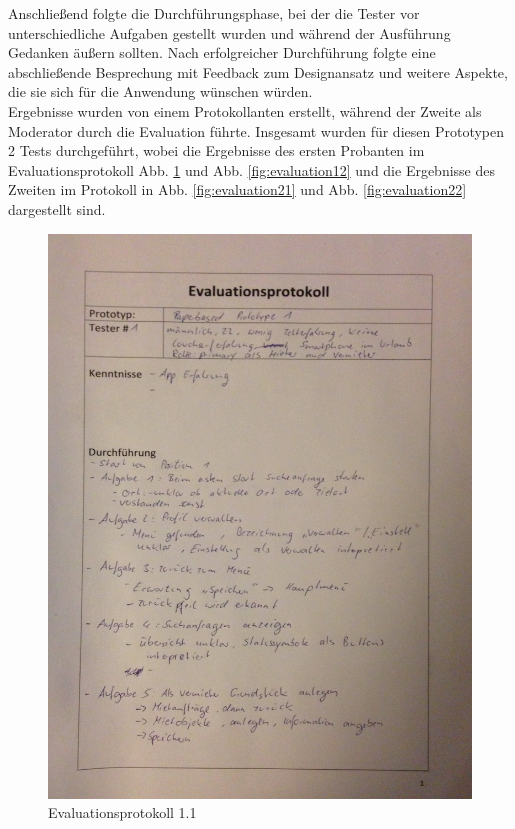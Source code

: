 Anschließend folgte die Durchführungsphase, bei der die Tester vor unterschiedliche Aufgaben gestellt wurden und während der Ausführung Gedanken äußern sollten. Nach erfolgreicher Durchführung folgte eine abschließende Besprechung mit Feedback zum Designansatz und weitere Aspekte, die sie sich für die Anwendung wünschen würden.\\
Ergebnisse wurden von einem Protokollanten erstellt, während der Zweite als Moderator durch die Evaluation führte.
Insgesamt wurden für diesen Prototypen 2 Tests durchgeführt, wobei die Ergebnisse des ersten Probanten im Evaluationsprotokoll Abb. \ref{fig:evaluation11} und Abb. \ref{fig:evaluation12} und die Ergebnisse des Zweiten im Protokoll in Abb. \ref{fig:evaluation21} und Abb. \ref{fig:evaluation22} dargestellt sind.

\newpage

\begin{figure}[H]
\includegraphics[width=1\textwidth]{./images/evaluation/eva11.JPG}
\caption{Evaluationsprotokoll 1.1}
\label{fig:evaluation11}
\end{figure}


